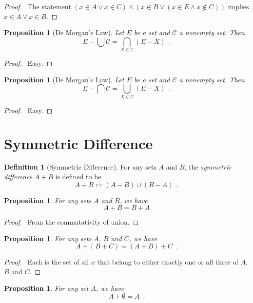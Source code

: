 \documentclass{report}
\let\qed\relax
\newtheorem{prop}[ax]{Proposition}
\theoremstyle{definition}
\newtheorem{df}[ax]{Definition}
\begin{document}
\begin{proof}
\pf\ The statement $(x \in A \vee x \in C) \wedge (x \in B \vee (x \in E \wedge x \notin C))$ implies $x \in A \vee x \in B$. \qed
\end{proof}

\begin{prop}[De Morgan's Law]
Let $E$ be a set and $\mathcal{C}$ a nonempty set. Then
\[ E - \bigcup \mathcal{C} = \bigcap_{X \in \mathcal{C}} (E - X) \enspace . \]
\end{prop}

\begin{proof}
\pf\ Easy. \qed
\end{proof}

\begin{prop}[De Morgan's Law]
Let $E$ be a set and $\mathcal{C}$ a nonempty set. Then
\[ E - \bigcap \mathcal{C} = \bigcup_{X \in \mathcal{C}} (E - X) \enspace . \]
\end{prop}

\begin{proof}
\pf\ Easy. \qed
\end{proof}

\section{Symmetric Difference}

\begin{df}[Symmetric Difference]
For any sets $A$ and $B$, the \emph{symmetric difference} $A + B$ is defined to be
\[ A + B := (A - B) \cup (B - A) \enspace . \]
\end{df}

\begin{prop}
For any sets $A$ and $B$, we have
\[ A + B = B + A \]
\end{prop}

\begin{proof}
\pf\ From the commutativity of union. \qed
\end{proof}

\begin{prop}
For any sets $A$, $B$ and $C$, we have
\[ A + (B + C) = (A + B) + C \enspace . \]
\end{prop}

\begin{proof}
\pf\ Each is the set of all $x$ that belong to either exactly one or all three of $A$, $B$ and $C$. \qed
\end{proof}

\begin{prop}
For any set $A$, we have
\[ A + \emptyset = A \enspace . \]
\end{prop}
\end{document}
